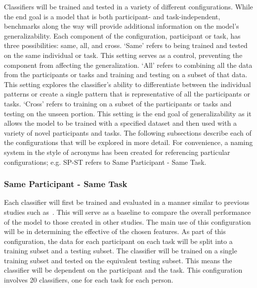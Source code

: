 \documentclass[11pt]{article}
\begin{document}
Classifiers will be trained and tested in a variety of different configurations. While the end goal is a model that is both participant- and task-independent, benchmarks along the way will provide additional information on the model's generalizability. Each component of the configuration, participant or task, has three possibilities: same, all, and cross. `Same' refers to being trained and tested on the same individual or task. This setting serves as a control, preventing the component from affecting the generalization. `All' refers to combining all the data from the participants or tasks and training and testing on a subset of that data. This setting explores the classifier's ability to differentiate between the individual patterns or create a single pattern that is representative of all the participants or tasks. `Cross' refers to training on a subset of the participants or tasks and testing on the unseen portion. This setting is the end goal of generalizability as it allows the model to be trained with a specified dataset and then used with a variety of novel participants and tasks. The following subsections describe each of the configurations that will be explored in more detail. For convenience, a naming system in the style of acronyms has been created for referencing particular configurations; e.g. SP-ST refers to Same Participant - Same Task.

\subsubsection{Same Participant - Same Task}
Each classifier will first be trained and evaluated in a manner similar to previous studies such as~\cite{Wilson, Zhang, Wang_R, Yin}. This will serve as a baseline to compare the overall performance of the model to those created in other studies. The main use of this configuration will be in determining the effective of the chosen features. As part of this configuration, the data for each participant on each task will be split into a training subset and a testing subset. The classifier will be trained on a single training subset and tested on the equivalent testing subset. This means the classifier will be dependent on the participant and the task. This configuration involves 20 classifiers, one for each task for each person.
\end{document}
